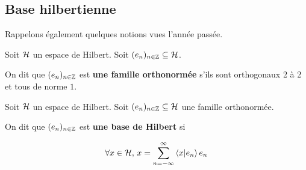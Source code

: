 \subsection{Base hilbertienne}

Rappelons également quelques notions vues l'année passée.

\begin{definition}
	Soit $\mathcal{H}$ un espace de Hilbert.
	Soit $(e_{n})_{n \in \mathbb{Z}} \subseteq \mathcal{H}$.

	On dit que $(e_{n})_{n \in \mathbb{Z}}$ est \textbf{une famille
	orthonormée} s'ils sont orthogonaux 2 à 2 et tous de norme $1$.
\end{definition}

\begin{definition}
	Soit $\mathcal{H}$ un espace de Hilbert.
	Soit $(e_{n})_{n \in \mathbb{Z}} \subseteq \mathcal{H}$ une famille
	orthonormée.

	On dit que $(e_{n})_{n \in \mathbb{Z}}$ est \textbf{une base de Hilbert} si

	\begin{equation}
	\forall x \in \mathcal{H}, \, x = \displaystyle \sum_{n = -\infty}^{\infty}
	\bra{x}\ket{e_{n}} e_{n}
	\end{equation}
\end{definition}


